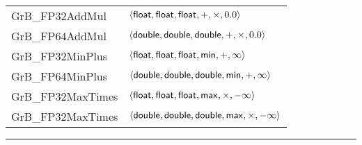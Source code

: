 \begin{table}[bt]
\begin{center}
\begin{tabular}{|l|l|}
				{\sf GrB\_FP32AddMul}		& $\left\langle {\sf float}, {\sf float}, {\sf float}, +, \times, 0.0 \right\rangle$ \\ 
				{\sf GrB\_FP64AddMul}		& $\left\langle {\sf double}, {\sf double}, {\sf double}, +, \times, 0.0 \right\rangle$ \\ 
                {\sf GrB\_FP32MinPlus}	& $\left\langle {\sf float}, {\sf float}, {\sf float}, {\sf min}, +, \infty \right\rangle$ \\ 
                {\sf GrB\_FP64MinPlus}	& $\left\langle {\sf double}, {\sf double}, {\sf double}, {\sf min}, +, \infty \right\rangle$ \\ 
                {\sf GrB\_FP32MaxTimes}	& $\left\langle {\sf float}, {\sf float}, {\sf float}, {\sf max}, \times, -\infty \right\rangle$ \\ 
                {\sf GrB\_FP32MaxTimes}	& $\left\langle {\sf double}, {\sf double}, {\sf double}, {\sf max}, \times, -\infty \right\rangle$ \\\hline
	\end{tabular}
	\end{center}
	\hrule
\end{table}
